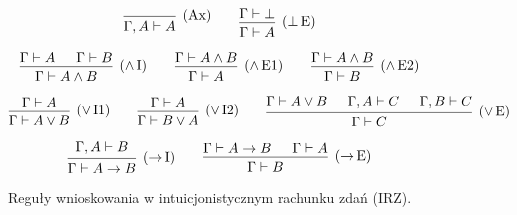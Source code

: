 \documentclass[polish,pretty,bibliography=totocnumbered]{angav}
\begin{document}
\begin{figure}[H]
    \[
    \begin{prooftree}
        \infer0[(Ax)]{\Gamma,A\vdash A}
    \end{prooftree}
    \qquad
    \begin{prooftree}
        \hypo{\Gamma\vdash \bot}
        \infer1[($\bot\!$ E)]{\Gamma\vdash A}
    \end{prooftree}
    \]

    \[
    \begin{prooftree}
        \hypo{\Gamma\vdash A}
        \hypo{\Gamma\vdash B}
        \infer2[($\land\!$ I)]{\Gamma\vdash A \land B}
    \end{prooftree}
    \qquad
    \begin{prooftree}
        \hypo{\Gamma\vdash A \land B}
        \infer1[($\land\!$ E1)]{\Gamma\vdash A}
    \end{prooftree}
    \qquad
    \begin{prooftree}
        \hypo{\Gamma\vdash A \land B}
        \infer1[($\land\!$ E2)]{\Gamma\vdash B}
    \end{prooftree}
    \]

    \[
    \begin{prooftree}
        \hypo{\Gamma\vdash A}
        \infer1[($\lor\!$ I1)]{\Gamma\vdash A \lor B}
    \end{prooftree}
    \qquad
    \begin{prooftree}
        \hypo{\Gamma\vdash A}
        \infer1[($\lor\!$ I2)]{\Gamma\vdash B \lor A}
    \end{prooftree}
    \qquad
    \begin{prooftree}
        \hypo{\Gamma\vdash A \lor B}
        \hypo{\Gamma,A\vdash C}
        \hypo{\Gamma,B\vdash C}
        \infer3[($\lor\!$ E)]{\Gamma\vdash C}
    \end{prooftree}
    \]

    \[
    \begin{prooftree}
        \hypo{\Gamma,A\vdash B}
        \infer1[($\to\!$ I)]{\Gamma\vdash A \to B}
    \end{prooftree}
    \qquad
    \begin{prooftree}
        \hypo{\Gamma\vdash A \to B}
        \hypo{\Gamma\vdash A}
        \infer2[($\to\!$ E)]{\Gamma\vdash B}
    \end{prooftree}
    \]
    \caption{Reguły wnioskowania w intuicjonistycznym rachunku zdań (IRZ).}
\end{figure}
\end{document}
